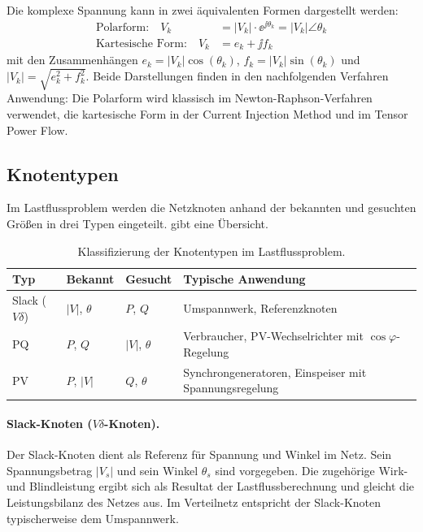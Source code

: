 Die komplexe Spannung kann in zwei äquivalenten Formen dargestellt werden:
\begin{align}
	\text{Polarform:} \quad V_k &= |V_k| \cdot \ee^{\jj \theta_k} = |V_k| \angle \theta_k \label{eq:polar}\\
	\text{Kartesische Form:} \quad V_k &= e_k + \jj f_k \label{eq:kartesisch}
\end{align}
mit den Zusammenhängen $e_k = |V_k| \cos(\theta_k)$, $f_k = |V_k| \sin(\theta_k)$ und $|V_k| = \sqrt{e_k^2 + f_k^2}$. Beide Darstellungen finden in den nachfolgenden Verfahren Anwendung: Die Polarform wird klassisch im Newton-Raphson-Verfahren verwendet, die kartesische Form in der Current Injection Method und im Tensor Power Flow.

\subsection{Knotentypen}
\label{subsec:knotentypen}

Im Lastflussproblem werden die Netzknoten anhand der bekannten und gesuchten Größen in drei Typen eingeteilt.  gibt eine Übersicht.

\begin{table}[H]
	\centering
	\caption{Klassifizierung der Knotentypen im Lastflussproblem.}
	\label{tab:knotentypen}
	\begin{tabular}{@{}lllp{5.5cm}@{}}
		\toprule
		\textbf{Typ} & \textbf{Bekannt} & \textbf{Gesucht} & \textbf{Typische Anwendung} \\
		\midrule
		Slack ($V\delta$) & $|V|$, $\theta$ & $P$, $Q$ & Umspannwerk, Referenzknoten \\
		PQ & $P$, $Q$ & $|V|$, $\theta$ & Verbraucher, PV-Wechselrichter mit $\cos\varphi$-Regelung \\
		PV & $P$, $|V|$ & $Q$, $\theta$ & Synchrongeneratoren, Einspeiser mit Spannungsregelung \\
		\bottomrule
	\end{tabular}
\end{table}

\paragraph{Slack-Knoten ($V\delta$-Knoten).}
Der Slack-Knoten dient als Referenz für Spannung und Winkel im Netz. Sein Spannungsbetrag $|V_s|$ und sein Winkel $\theta_s$ sind vorgegeben. Die zugehörige Wirk- und Blindleistung ergibt sich als Resultat der Lastflussberechnung und gleicht die Leistungsbilanz des Netzes aus. Im Verteilnetz entspricht der Slack-Knoten typischerweise dem Umspannwerk.

